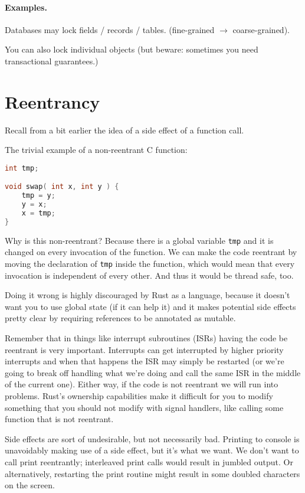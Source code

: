 \paragraph{Examples.}

    Databases may lock fields / records / tables. (fine-grained $\rightarrow$ coarse-grained).

    You can also lock individual objects (but beware: sometimes you need transactional guarantees.)

\section*{Reentrancy}

Recall from a bit earlier the idea of a side effect of a function call.

The trivial example of a non-reentrant C function:
\begin{lstlisting}[language=C]
int tmp;

void swap( int x, int y ) {
    tmp = y;
    y = x;
    x = tmp;
}
\end{lstlisting}

Why is this non-reentrant? Because there is a global variable \texttt{tmp} and it is changed on every invocation of the function. We can make the code reentrant by moving the declaration of \texttt{tmp} inside the function, which would mean that every invocation is independent of every other. And thus it would be thread safe, too.

Doing it wrong is highly discouraged by Rust as a language, because it doesn't want you to use global state (if it can help it) and it makes potential side effects pretty clear by requiring references to be annotated as mutable.

Remember that in things like interrupt subroutines (ISRs) having the code be reentrant is very important. Interrupts can get interrupted by higher priority interrupts and when that happens the ISR may simply be restarted (or we're going to break off handling what we're doing and call the same ISR in the middle of the current one). Either way, if the code is not reentrant we will run into problems. Rust's ownership capabilities make it difficult for you to modify something that you should not modify with signal handlers, like calling some function that is not reentrant.

Side effects are sort of undesirable, but not necessarily bad. Printing to console is unavoidably making use of a side effect, but it's what we want. We don't want to call print reentrantly; interleaved print calls would result in jumbled output. Or alternatively, restarting the print routine might result in some doubled characters on the screen.

